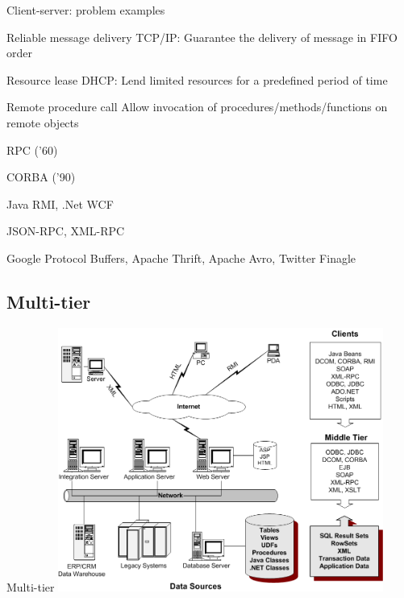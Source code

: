 \begin{frame}[shrink]{Client-server: problem examples}
\begin{block}{Reliable message delivery}
TCP/IP: Guarantee the delivery of message in FIFO order
\end{block}

\begin{block}{Resource lease}
DHCP: Lend limited resources for a predefined period of time
\end{block}

\begin{block}{Remote procedure call}
Allow invocation of procedures/methods/functions on remote objects
\BI
\item RPC ('60)
\item CORBA ('90)
\item Java RMI, .Net WCF 
\item JSON-RPC, XML-RPC
\item Google Protocol Buffers, Apache Thrift, Apache Avro, Twitter Finagle
\EI
\end{block}

\end{frame}



\subsection{Multi-tier}

\begin{frame}{Multi-tier}
\includegraphics[width=0.8\textwidth]{figs/01/multi-tier.png}	
\end{frame}

